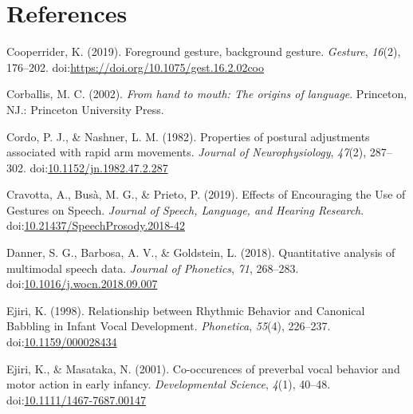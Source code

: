 \documentclass[
  man, noextraspace,floatsintext]{apa6}
\newlength{\cslhangindent}
\newenvironment{cslreferences}%
  {\setlength{\parindent}{0pt}%
  \everypar{\setlength{\hangindent}{\cslhangindent}}\ignorespaces}%
  {\par}
\begin{document}
\hypertarget{references}{%
\section{References}\label{references}}

\begingroup
\setlength{\parindent}{-0.5in}
\setlength{\leftskip}{0.5in}

\hypertarget{refs}{}
\begin{cslreferences}
\leavevmode\hypertarget{ref-cooperriderForegroundGestureBackground2019}{}%
Cooperrider, K. (2019). Foreground gesture, background gesture. \emph{Gesture}, \emph{16}(2), 176--202. doi:\href{https://doi.org/https://doi.org/10.1075/gest.16.2.02coo}{https://doi.org/10.1075/gest.16.2.02coo}

\leavevmode\hypertarget{ref-corballisHandMouthOrigins2002}{}%
Corballis, M. C. (2002). \emph{From hand to mouth: The origins of language}. Princeton, NJ.: Princeton University Press.

\leavevmode\hypertarget{ref-cordoPropertiesPosturalAdjustments1982}{}%
Cordo, P. J., \& Nashner, L. M. (1982). Properties of postural adjustments associated with rapid arm movements. \emph{Journal of Neurophysiology}, \emph{47}(2), 287--302. doi:\href{https://doi.org/10.1152/jn.1982.47.2.287}{10.1152/jn.1982.47.2.287}

\leavevmode\hypertarget{ref-cravottaEffectsEncouragingUse2019}{}%
Cravotta, A., Busà, M. G., \& Prieto, P. (2019). Effects of Encouraging the Use of Gestures on Speech. \emph{Journal of Speech, Language, and Hearing Research}. doi:\href{https://doi.org/10.21437/SpeechProsody.2018-42}{10.21437/SpeechProsody.2018-42}

\leavevmode\hypertarget{ref-dannerQuantitativeAnalysisMultimodal2018}{}%
Danner, S. G., Barbosa, A. V., \& Goldstein, L. (2018). Quantitative analysis of multimodal speech data. \emph{Journal of Phonetics}, \emph{71}, 268--283. doi:\href{https://doi.org/10.1016/j.wocn.2018.09.007}{10.1016/j.wocn.2018.09.007}

\leavevmode\hypertarget{ref-ejiriRelationshipRhythmicBehavior1998}{}%
Ejiri, K. (1998). Relationship between Rhythmic Behavior and Canonical Babbling in Infant Vocal Development. \emph{Phonetica}, \emph{55}(4), 226--237. doi:\href{https://doi.org/10.1159/000028434}{10.1159/000028434}

\leavevmode\hypertarget{ref-ejiriCooccurencesPreverbalVocal2001}{}%
Ejiri, K., \& Masataka, N. (2001). Co-occurences of preverbal vocal behavior and motor action in early infancy. \emph{Developmental Science}, \emph{4}(1), 40--48. doi:\href{https://doi.org/10.1111/1467-7687.00147}{10.1111/1467-7687.00147}


\end{cslreferences}
\end{document}
